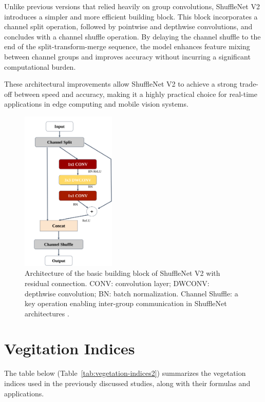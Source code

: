Unlike previous versions that relied heavily on group convolutions, ShuffleNet V2 introduces a simpler and more efficient building block. This block incorporates a channel split operation, followed by pointwise and depthwise convolutions, and concludes with a channel shuffle operation. By delaying the channel shuffle to the end of the split-transform-merge sequence, the model enhances feature mixing between channel groups and improves accuracy without incurring a significant computational burden.

These architectural improvements allow ShuffleNet V2 to achieve a strong trade-off between speed and accuracy, making it a highly practical choice for real-time applications in edge computing and mobile vision systems.

\begin{figure}[H]
    \centering
    \includegraphics[width=0.4\textwidth]{appendices/images/ShuffleNet.png}
    \caption{\footnotesize Architecture of the basic building block of ShuffleNet V2 with residual connection. CONV: convolution layer; DWCONV: depthwise convolution; BN: batch normalization. Channel Shuffle: a key operation enabling inter-group communication in ShuffleNet architectures \parencite{dobko2020cnn}.}
    \label{fig:ShuffleNet}
\end{figure}


\section{Vegitation Indices}
The table below (Table~\ref{tab:vegetation-indices2}) summarizes the vegetation indices used in the previously discussed studies, along with their formulas and applications.

